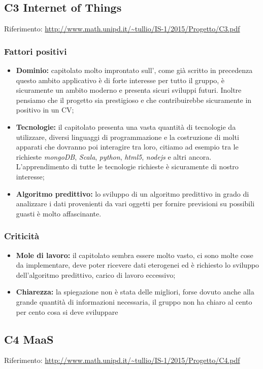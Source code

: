 \documentclass{scalatekids-article}
\begin{document}
\subsection{C3 Internet of Things}
Riferimento: \url{http://www.math.unipd.it/~tullio/IS-1/2015/Progetto/C3.pdf}\\
\subsubsection{Fattori positivi}
\begin{itemize}
  \item \textbf{Dominio:} capitolato molto improntato sull', come già scritto in precedenza questo ambito applicativo è di forte interesse per tutto il gruppo, è sicuramente un ambito moderno e presenta sicuri sviluppi futuri. Inoltre pensiamo che il progetto sia prestigioso e che contribuirebbe sicuramente in positivo in un CV;
  \item \textbf{Tecnologie:} il capitolato presenta una vasta quantità di tecnologie da utilizzare, diversi linguaggi di programmazione e la costruzione di molti apparati che dovranno poi interagire tra loro, citiamo ad esempio tra le richieste \textit{mongoDB}, \textit{Scala}, \textit{python}, \textit{html5}, \textit{nodejs} e altri ancora. L'apprendimento di tutte le tecnologie richieste è sicuramente di nostro interesse;
  \item \textbf{Algoritmo predittivo:} lo sviluppo di un algoritmo predittivo in grado di analizzare i dati provenienti da vari oggetti per fornire previsioni su possibili guasti è molto affascinante.
\end{itemize}
\subsubsection{Criticità}
\begin{itemize}
  \item \textbf{Mole di lavoro:} il capitolato sembra essere molto vasto, ci sono molte cose da implementare, deve poter ricevere dati eterogenei ed è richiesto lo sviluppo dell'algoritmo predittivo, carico di lavoro eccessivo;
  \item \textbf{Chiarezza:} la spiegazione non è stata delle migliori, forse dovuto anche alla grande quantità di informazioni necessaria, il gruppo non ha chiaro al cento per cento cosa si deve sviluppare
\end{itemize}

\subsection{C4 MaaS}
Riferimento: \url{http://www.math.unipd.it/~tullio/IS-1/2015/Progetto/C4.pdf}\\ 
\end{document}
